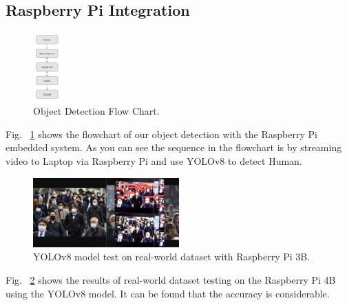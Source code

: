 \subsection{Raspberry Pi Integration}

\begin{figure}[H]
    \centerline{\includegraphics[width=0.1\textwidth]{Figures/Results/Object Detection.png}}
    \caption{Object Detection Flow Chart.}
    \label{fig3a1}
\end{figure}

Fig. ~\ref{fig3a1} shows the flowchart of our object detection with the Raspberry Pi embedded system. As you can see the sequence in the flowchart is by streaming video to Laptop via Raspberry Pi and use YOLOv8 to detect Human.

\begin{figure}[H]
    \centerline{\includegraphics[width=0.5\textwidth]{Figures/Results/RPi_YOLOv8.png}}
    \caption{YOLOv8 model test on real-world dataset with Raspberry Pi 3B.}
    \label{fig3a2}
\end{figure}

Fig. ~\ref{fig3a2} shows the results of real-world dataset testing on the Raspberry Pi 4B using the YOLOv8 model. It can be found that the accuracy is considerable.


